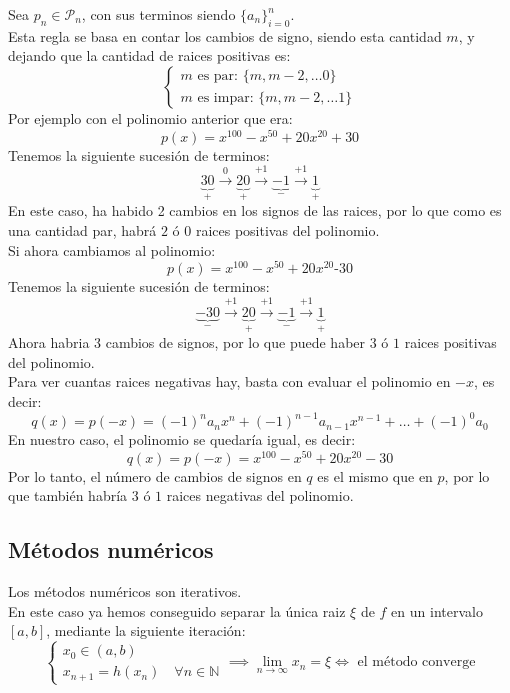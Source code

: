 \begin{teorema}
    Sea $p_n \in \mathcal{P}_n$, con sus terminos siendo $\{ a_n \}_{i=0}^{n}$.\\
    Esta regla se basa en contar los cambios de signo, siendo esta cantidad $m$, y dejando que la cantidad de raices positivas es:
    \[
        \begin{cases}
            m \text{ es par: } \{m, m-2, \ldots 0\} \\
            m \text{ es impar: } \{m, m-2, \ldots 1\}
        \end{cases}
    \]
    Por ejemplo con el polinomio anterior que era:
    \[
        p(x) = x^{100} - x^{50} +20x^{20} + 30
    \]
    Tenemos la siguiente sucesión de terminos:
    \[
        \underbrace{30}_{+} \xrightarrow{0} \underbrace{20}_{+} \xrightarrow{+1}
        \underbrace{-1}_{-} \xrightarrow{+1} \underbrace{1}_{+}
    \]
    En este caso, ha habido 2 cambios en los signos de las raices, por lo que como es una cantidad par, habrá $2$ ó $0$ raices positivas del polinomio.\\
    Si ahora cambiamos al polinomio:
    \[
        p(x) = x^{100} - x^{50} +20x^{20} \textbf{-} 30
    \]
    Tenemos la siguiente sucesión de terminos:
    \[
        \underbrace{-30}_{-} \xrightarrow{+1} \underbrace{20}_{+} \xrightarrow{+1}
        \underbrace{-1}_{-} \xrightarrow{+1} \underbrace{1}_{+}
    \]
    Ahora habria 3 cambios de signos, por lo que puede haber $3$ ó $1$ raices positivas del polinomio.\\
    Para ver cuantas raices negativas hay, basta con evaluar el polinomio en $-x$, es decir:
    \[
        q(x) = p(-x) = (-1)^n a_n x^n + (-1)^{n-1} a_{n-1} x^{n-1} + \ldots + (-1)^0 a_0
    \]
    En nuestro caso, el polinomio se quedaría igual, es decir:
    \[
        q(x) = p(-x) =  x^{100} - x^{50} +20x^{20} - 30
    \]
    Por lo tanto, el número de cambios de signos en $q$ es el mismo que en $p$, por lo que también habría $3$ ó $1$ raices negativas del polinomio.
\end{teorema}

\subsection{Métodos numéricos}

Los métodos numéricos son iterativos.\\

En este caso ya hemos conseguido separar la única raiz $\xi$ de $f$ en un intervalo $[a,b]$, mediante la siguiente iteración:
\[
    \begin{cases}
        x_0 \in (a,b) \\
        x_{n+1} = h(x_n) \quad \forall n \in \mathbb{N}
    \end{cases}
    \implies
    \lim_{n\to\infty} x_n = \xi \iff \text{ el método converge}
\]

